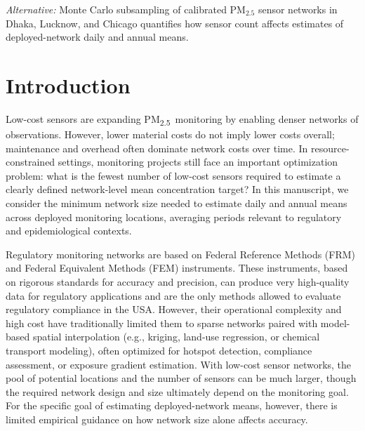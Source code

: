 \documentclass[12pt]{article}
\theoremstyle{remark}
\newcommand{\pmtt}{\textrm{PM\textsubscript{2.5}}}
\begin{document}
\textit{Alternative: }Monte Carlo subsampling of calibrated PM$_{2.5}$ sensor networks in Dhaka, Lucknow, and Chicago quantifies how sensor count affects estimates of deployed-network daily and annual means.




\section*{Introduction}\label{sec:intro}

Low-cost sensors are expanding \pmtt\ monitoring by enabling denser networks of observations. However, lower material costs do not imply lower costs overall; maintenance and overhead often dominate network costs over time.\supercite{kumar_2015_RiseLowcostSensing} In resource-constrained settings, monitoring projects still face an important optimization problem: what is the fewest number of low-cost sensors required to estimate a clearly defined network-level mean concentration target? In this manuscript, we consider the minimum network size needed to estimate daily and annual means across deployed monitoring locations, averaging periods relevant to regulatory and epidemiological contexts.\supercite{noauthor_who_2021,us_epa_national_2020}

Regulatory monitoring networks are based on Federal Reference Methods (FRM) and Federal Equivalent Methods (FEM) instruments. These instruments, based on rigorous standards for accuracy and precision, can produce very high-quality data for regulatory applications and are the only methods allowed to evaluate regulatory compliance in the USA.\supercite{us_epa_40cfr_58_app_c} However, their operational complexity and high cost have traditionally limited them to sparse networks paired with model-based spatial interpolation (e.g., kriging, land-use regression, or chemical transport modeling), often optimized for hotspot detection, compliance assessment, or exposure gradient estimation. With low-cost sensor networks, the pool of potential locations and the number of sensors can be much larger, though the required network design and size ultimately depend on the monitoring goal. For the specific goal of estimating deployed-network means, however, there is limited empirical guidance on how network size alone affects accuracy.
\end{document}
